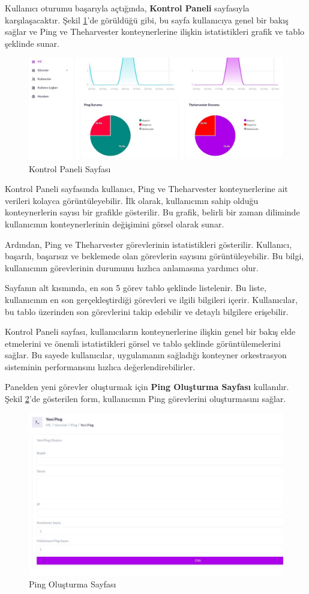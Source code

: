 Kullanıcı oturumu başarıyla açtığında, \textbf{Kontrol Paneli} sayfasıyla karşılaşacaktır. Şekil \ref{fig:dashboard}'de görüldüğü gibi, bu sayfa kullanıcıya genel bir bakış sağlar ve Ping ve Theharvester konteynerlerine ilişkin istatistikleri grafik ve tablo şeklinde sunar.

\begin{figure}[ht]
	\centering
	\includegraphics[width=0.7\linewidth]{images/dashboard.jpeg}
	\caption{Kontrol Paneli Sayfası}
	\label{fig:dashboard}
\end{figure}

Kontrol Paneli sayfasında kullanıcı, Ping ve Theharvester konteynerlerine ait verileri kolayca görüntüleyebilir. İlk olarak, kullanıcının sahip olduğu konteynerlerin sayısı bir grafikle gösterilir. Bu grafik, belirli bir zaman diliminde kullanıcının konteynerlerinin değişimini görsel olarak sunar.

Ardından, Ping ve Theharvester görevlerinin istatistikleri gösterilir. Kullanıcı, başarılı, başarısız ve beklemede olan görevlerin sayısını görüntüleyebilir. Bu bilgi, kullanıcının görevlerinin durumunu hızlıca anlamasına yardımcı olur.

Sayfanın alt kısmında, en son 5 görev tablo şeklinde listelenir. Bu liste, kullanıcının en son gerçekleştirdiği görevleri ve ilgili bilgileri içerir. Kullanıcılar, bu tablo üzerinden son görevlerini takip edebilir ve detaylı bilgilere erişebilir.

Kontrol Paneli sayfası, kullanıcıların konteynerlerine ilişkin genel bir bakış elde etmelerini ve önemli istatistikleri görsel ve tablo şeklinde görüntülemelerini sağlar. Bu sayede kullanıcılar, uygulamanın sağladığı konteyner orkestrasyon sisteminin performansını hızlıca değerlendirebilirler.

Panelden yeni görevler oluşturmak için \textbf{Ping Oluşturma Sayfası} kullanılır. Şekil \ref{fig:create}'de gösterilen form, kullanıcının Ping görevlerini oluşturmasını sağlar.

\begin{figure}[ht]
	\centering
	\includegraphics[width=0.7\linewidth]{images/create.jpeg}
	\caption{Ping Oluşturma Sayfası}
	\label{fig:create}
\end{figure}

